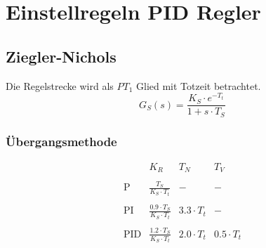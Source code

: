 



\section{Einstellregeln PID Regler}

\subsection{Ziegler-Nichols}
Die Regelstrecke wird als $PT_1$ Glied mit Totzeit betrachtet. 
\[ G_S(s) = \frac{K_S \cdot e^{-T_t}}{1 + s \cdot T_S} \]

\subsubsection{Übergangsmethode}
\begin{table}[h!]
    \[
        \begin{array}{lccc}
            &
                K_R &
                T_N &
                T_V \\\\
            \text{P} &
                \frac{T_S}{K_S \cdot T_t} &
                - &
                - \\\\
            \text{PI} &
                \frac{0.9 \cdot T_S}{K_S \cdot T_t} &
                3.3 \cdot T_t &
                - \\\\
            \text{PID} &
                \frac{1.2 \cdot T_S}{K_S \cdot T_t} &
                2.0 \cdot T_t &
                0.5 \cdot T_t \\\\
        \end{array}
    \]
\end{table}

